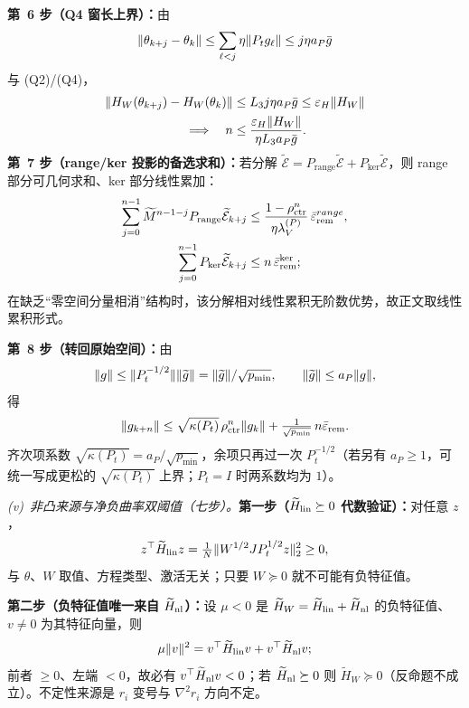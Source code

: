 \documentclass[fontset=windows,11pt]{ctexart}
\DeclarePairedDelimiter{\norm}{\lVert}{\rVert}
\newcommand{\W}{W}
\newcommand{\Erem}{\mathcal E}
\newcommand{\wt}[1]{\widetilde{#1}}
\numberwithin{equation}{section}
\begin{document}
\noindent\textbf{第~6 步（Q4 窗长上界）：}由
\begin{equation}
\norm{\theta_{k+j}-\theta_k}\le\sum_{\ell<j}\eta\norm{P_tg_\ell}\le j\eta a_P\bar g
\end{equation}
与 (Q2)/(Q4)，
\begin{align}
\norm{H_{\W}(\theta_{k+j})-H_{\W}(\theta_k)}
&\le L_3j\eta a_P\bar g\le\varepsilon_H\norm{H_{\W}}\notag\\
\Longrightarrow\quad
n&\le\frac{\varepsilon_H\norm{H_{\W}}}{\eta L_3a_P\bar g}.
\end{align}
\textbf{第~7 步（range/ker 投影的备选求和）：}若分解 $\wt\Erem=P_{\operatorname{range}}\wt\Erem+P_{\ker}\wt\Erem$，则 range 部分可几何求和、ker 部分线性累加：
\begin{align}
\sum_{j=0}^{n-1}\wt M^{n-1-j}P_{\operatorname{range}}\wt\Erem_{k+j}
&\le\frac{1-\rho_{\rm ctr}^n}{\eta\lambda_V^{(P)}}\,\bar\varepsilon_{\rm rem}^{range},\\
\sum_{j=0}^{n-1}P_{\ker}\wt\Erem_{k+j}&\le n\,\bar\varepsilon_{\rm rem}^{\ker};
\end{align}
在缺乏“零空间分量相消”结构时，该分解相对线性累积无阶数优势，故正文取线性累积形式。

\noindent\textbf{第~8 步（转回原始空间）：}由
\begin{equation}
\norm g\le\norm{P_t^{-1/2}}\norm{\wt g}=\norm{\wt g}/\sqrt{p_{\min}},\qquad
\norm{\wt g}\le a_P\norm g,
\end{equation}
得
\begin{equation}
\norm{g_{k+n}}\le\sqrt{\kappa(P_t)}\,\rho_{\rm ctr}^n\norm{g_k}+\tfrac1{\sqrt{p_{\min}}}\,n\bar\varepsilon_{\rm rem}.
\label{eq:multistep}
\end{equation}
齐次项系数 $\sqrt{\kappa(P_t)}=a_P/\sqrt{p_{\min}}$，余项只再过一次 $P_t^{-1/2}$（若另有 $a_P\ge1$，可统一写成更松的 $\sqrt{\kappa(P_t)}$ 上界；$P_t=I$ 时两系数均为 $1$）。

\medskip
\emph{(v)~非凸来源与净负曲率双阈值（七步）。}\textbf{第一步（$\wt H_{\rm lin}\succeq0$ 代数验证）：}对任意 $z$，
\begin{equation}
z^\top\wt H_{\rm lin}z=\tfrac1N\norm{\W^{1/2}JP_t^{1/2}z}_2^2\ge0,
\end{equation}
与 $\theta$、$\W$ 取值、方程类型、激活无关；只要 $\W\succeq0$ 就不可能有负特征值。

\noindent\textbf{第二步（负特征值唯一来自 $\wt H_{\rm nl}$）：}设 $\mu<0$ 是 $\wt H_{\W}=\wt H_{\rm lin}+\wt H_{\rm nl}$ 的负特征值、$v\ne0$ 为其特征向量，则
\begin{equation}
\mu\norm v^2=v^\top\wt H_{\rm lin}v+v^\top\wt H_{\rm nl}v;
\end{equation}
前者 $\ge0$、左端 $<0$，故必有 $v^\top\wt H_{\rm nl}v<0$；若 $\wt H_{\rm nl}\succeq0$ 则 $\wt H_{\W}\succeq0$（反命题不成立）。不定性来源是 $r_i$ 变号与 $\nabla^2r_i$ 方向不定。
\end{document}
